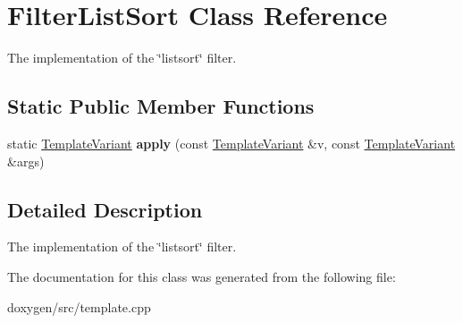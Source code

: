 \hypertarget{class_filter_list_sort}{}\section{Filter\+List\+Sort Class Reference}
\label{class_filter_list_sort}


The implementation of the \char`\"{}listsort\char`\"{} filter.  


\subsection*{Static Public Member Functions}
\begin{DoxyCompactItemize}
\item 
\mbox{\label{class_filter_list_sort_a1e8187e5797487d27befe1994c987d28}} 
static \mbox{\hyperlink{class_template_variant}{Template\+Variant}} {\bfseries apply} (const \mbox{\hyperlink{class_template_variant}{Template\+Variant}} \&v, const \mbox{\hyperlink{class_template_variant}{Template\+Variant}} \&args)
\end{DoxyCompactItemize}


\subsection{Detailed Description}
The implementation of the \char`\"{}listsort\char`\"{} filter. 

The documentation for this class was generated from the following file\+:\begin{DoxyCompactItemize}
\item 
doxygen/src/template.\+cpp\end{DoxyCompactItemize}
